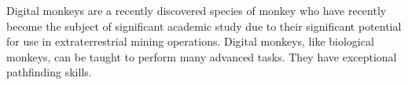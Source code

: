 Digital monkeys are a recently discovered species of monkey who have recently become the
subject of significant academic study due to their significant potential for use in
extraterrestrial mining operations.
Digital monkeys, like biological monkeys, can be taught to perform many advanced tasks.
They have exceptional pathfinding skills.